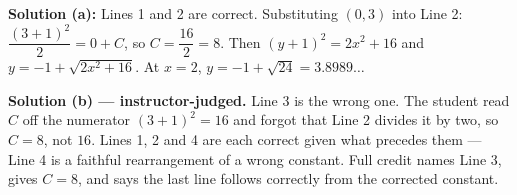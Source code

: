 \documentclass[12pt]{article}
\begin{document}
\textbf{Solution (a):} Lines 1 and 2 are correct. Substituting $(0,3)$ into Line 2: $\dfrac{(3+1)^2}{2} = 0 + C$, so $C = \dfrac{16}{2} = 8$. Then $(y+1)^2 = 2x^2 + 16$ and $y = -1 + \sqrt{2x^2 + 16}$. At $x = 2$, $y = -1 + \sqrt{24} = 3.8989\ldots$ 

\textbf{Solution (b) --- instructor-judged.} Line 3 is the wrong one. The student read $C$ off the numerator $(3+1)^2 = 16$ and forgot that Line 2 divides it by two, so $C = 8$, not $16$. Lines 1, 2 and 4 are each correct given what precedes them --- Line 4 is a faithful rearrangement of a wrong constant. Full credit names Line 3, gives $C = 8$, and says the last line follows correctly from the corrected constant.
\end{document}
